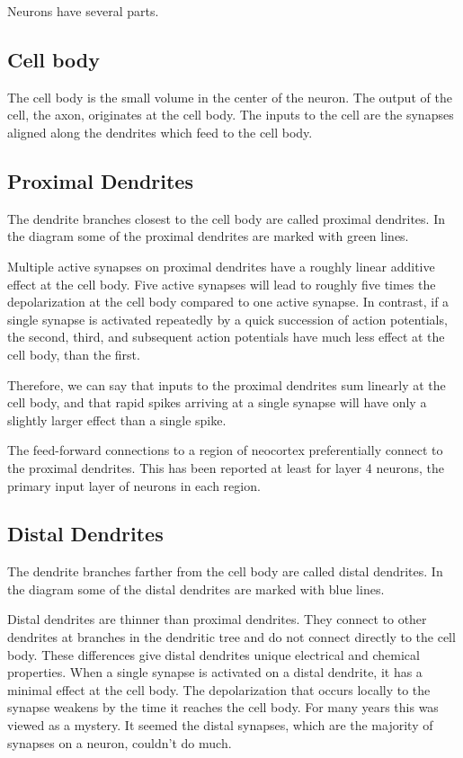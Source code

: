 \documentclass{report}
\begin{document}
Neurons have several parts.

\subsection*{Cell body}
The cell body is the small volume in the center of the neuron. The
output of the cell, the axon, originates at the cell body. The inputs
to the cell are the synapses aligned along the dendrites which feed to
the cell body.

\subsection*{Proximal Dendrites}
The dendrite branches closest to the cell body are called proximal
dendrites. In the diagram some of the proximal dendrites are marked
with green lines.

Multiple active synapses on proximal dendrites have a roughly linear
additive effect at the cell body. Five active synapses will lead to
roughly five times the depolarization at the cell body compared to one
active synapse. In contrast, if a single synapse is activated
repeatedly by a quick succession of action potentials, the second,
third, and subsequent action potentials have much less effect at the
cell body, than the first.

Therefore, we can say that inputs to the proximal dendrites sum
linearly at the cell body, and that rapid spikes arriving at a single
synapse will have only a slightly larger effect than a single spike.

The feed-forward connections to a region of neocortex preferentially
connect to the proximal dendrites. This has been reported at least for
layer 4 neurons, the primary input layer of neurons in each region.

\subsection*{Distal Dendrites}
The dendrite branches farther from the cell body are called distal
dendrites. In the diagram some of the distal dendrites are marked with
blue lines.

Distal dendrites are thinner than proximal dendrites. They connect to
other dendrites at branches in the dendritic tree and do not connect
directly to the cell body. These differences give distal dendrites
unique electrical and chemical properties. When a single synapse is
activated on a distal dendrite, it has a minimal effect at the cell
body. The depolarization that occurs locally to the synapse weakens by
the time it reaches the cell body. For many years this was viewed as a
mystery. It seemed the distal synapses, which are the majority of
synapses on a neuron, couldn't do much.
\end{document}
